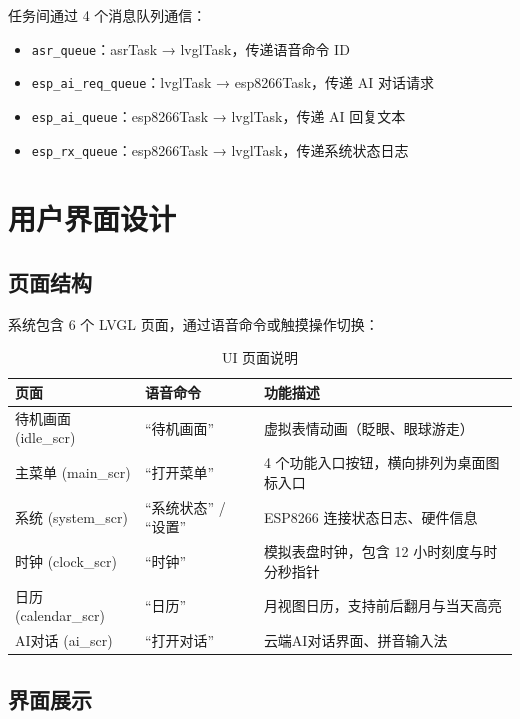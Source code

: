 \documentclass[12pt,a4paper]{ctexart}
\begin{document}
任务间通过 4 个消息队列通信：

\begin{itemize}
    \item \texttt{asr\_queue}：asrTask → lvglTask，传递语音命令 ID
    \item \texttt{esp\_ai\_req\_queue}：lvglTask → esp8266Task，传递 AI 对话请求
    \item \texttt{esp\_ai\_queue}：esp8266Task → lvglTask，传递 AI 回复文本
    \item \texttt{esp\_rx\_queue}：esp8266Task → lvglTask，传递系统状态日志
\end{itemize}

\section{用户界面设计}

\subsection{页面结构}

系统包含 6 个 LVGL 页面，通过语音命令或触摸操作切换：

\begin{table}[H]
\centering
\begin{tabularx}{\textwidth}{llX}
\toprule
\textbf{页面} & \textbf{语音命令} & \textbf{功能描述} \\
\midrule
待机画面 (idle\_scr) & ``待机画面'' & 虚拟表情动画（眨眼、眼球游走） \\
主菜单 (main\_scr) & ``打开菜单'' & 4 个功能入口按钮，横向排列为桌面图标入口 \\
系统 (system\_scr)  & ``系统状态'' / ``设置'' & ESP8266 连接状态日志、硬件信息 \\
时钟 (clock\_scr)   & ``时钟'' & 模拟表盘时钟，包含 12 小时刻度与时分秒指针 \\
日历 (calendar\_scr) & ``日历'' & 月视图日历，支持前后翻月与当天高亮 \\
AI对话 (ai\_scr)     & ``打开对话'' & 云端AI对话界面、拼音输入法 \\
\bottomrule
\end{tabularx}
\caption{UI 页面说明}
\end{table}

\subsection{界面展示}
\end{document}
